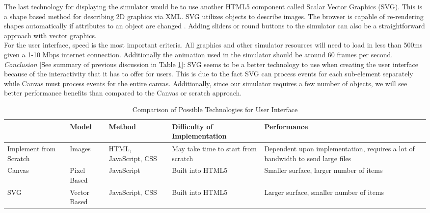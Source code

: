 \documentclass[10pt, onecolumn, draftclsnofoot, letterpaper, compsoc]{IEEEtran}
\begin{document}
The last technology for displaying the simulator would be to use another HTML5
component called Scalar Vector Graphics (SVG). This is a shape based method
for describing 2D graphics via XML.  SVG utilizes objects to describe images.
The browser is capable of re-rendering shapes automatically if attributes to
an object are changed \cite{SVG}. Adding sliders or round buttons to the
simulator can also be a straightforward approach with vector graphics. \\

For the user interface, speed is the most important criteria. All graphics and
other simulator resources will need to load in less than 500ms given a 1-10
Mbps internet connection. Additionally the animation used in the simulator
should be around 60 frames per second. \\

\textit{Conclusion} [See summary of previous discussion in Table \ref{table:Jake1}]:
SVG seems to be a better technology to use when creating
the user interface because of the interactivity that it has to offer for users.
This is due to the fact SVG can process events for each sub-element separately
while Canvas must process events for the entire canvas. Additionally, since
our simulator requires a few number of objects, we will see better performance
benefits than compared to the Canvas or scratch approach. \\

\begin{table}[h]
\centering
\caption{Comparison of Possible Technologies for User Interface}
\begin{tabular}{|p{3.15cm}|p{2cm}|p{2cm}|p{3.15cm}|p{3.15cm}|}
\cline{5-4}

\hline  & Model & Method & Difficulty of Implementation & Performance\\ \hline

Implement from Scratch & Images & HTML, JavaScript, CSS & May take time to
start from scratch & Dependent upon implementation, requires a lot of
bandwidth to send large files \\ \hline

Canvas & Pixel Based & JavaScript & Built into HTML5 & Smaller surface,
larger number of items \\ \hline

SVG & Vector Based & JavaScript, CSS & Built into HTML5 & Larger surface,
smaller number of items \\ \hline

\end{tabular}
\label{table:Jake1}
\end{table}
\end{document}
